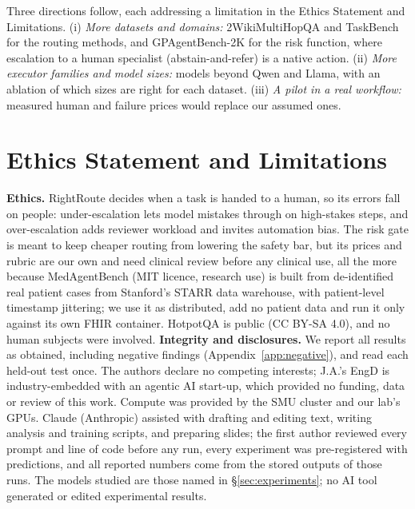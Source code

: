 \documentclass{article}
\newif\iftwowiki \twowikifalse
\begin{document}
Three directions follow, each addressing a limitation in the Ethics Statement and Limitations. (i) \emph{More datasets and domains:} \iftwowiki TaskBench\else 2WikiMultiHopQA and TaskBench\fi{} for the routing methods, and GPAgentBench-2K \citep{chen2026gpagentbench} for the risk function, where escalation to a human specialist (abstain-and-refer) is a native action. (ii) \emph{More executor families and model sizes:} models beyond Qwen and Llama, with an ablation of which sizes are right for each dataset. (iii) \emph{A pilot in a real workflow:} measured human and failure prices would replace our assumed ones.

\section*{Ethics Statement and Limitations}
\textbf{Ethics.} RightRoute decides when a task is handed to a human, so its errors fall on people: under-escalation lets model mistakes through on high-stakes steps, and over-escalation adds reviewer workload and invites automation bias. The risk gate is meant to keep cheaper routing from lowering the safety bar, but its prices and rubric are our own and need clinical review before any clinical use, all the more because MedAgentBench (MIT licence, research use) is built from de-identified real patient cases from Stanford's STARR data warehouse, with patient-level timestamp jittering; we use it as distributed, add no patient data and run it only against its own FHIR container. HotpotQA is public (CC BY-SA 4.0), and no human subjects were involved. \textbf{Integrity and disclosures.} We report all results as obtained, including negative findings (Appendix~\ref{app:negative}), and read each held-out test once. The authors declare no competing interests; J.A.'s EngD is industry-embedded with an agentic AI start-up, which provided no funding, data or review of this work. Compute was provided by the SMU cluster and our lab's GPUs. Claude (Anthropic) assisted with drafting and editing text, writing analysis and training scripts, and preparing slides; the first author reviewed every prompt and line of code before any run, every experiment was pre-registered with predictions, and all reported numbers come from the stored outputs of those runs. The models studied are those named in \S\ref{sec:experiments}; no AI tool generated or edited experimental results.
\end{document}
